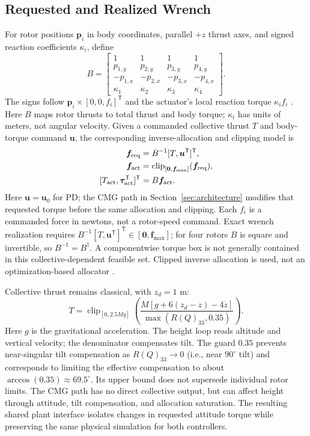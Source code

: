 \documentclass[letterpaper, 10 pt, conference]{ieeeconf}
\newcommand{\T}{^{\mathsf T}}
\newcommand{\clip}{\operatorname{clip}}
\begin{document}
\subsection{Requested and Realized Wrench}
For rotor positions $\bm p_i$ in body coordinates, parallel $+z$ thrust
axes, and signed reaction coefficients $\kappa_i$, define
\begin{equation}
 B=\begin{bmatrix}
 1&1&1&1\\p_{1,y}&p_{2,y}&p_{3,y}&p_{4,y}\\
 -p_{1,x}&-p_{2,x}&-p_{3,x}&-p_{4,x}\\
 \kappa_1&\kappa_2&\kappa_3&\kappa_4
 \end{bmatrix}.
 \label{eq:allocationmatrix}
\end{equation}
The signs follow $\bm p_i\times[0,0,f_i]\T$ and the actuator's local reaction torque $\kappa_i f_i$ \cite{garciacarrillo2013quad}. Here $B$ maps rotor thrusts to total thrust and body torque; $\kappa_i$ has units of meters, not angular velocity. Given a commanded collective thrust $T$ and body-torque command $\bm u$, the corresponding inverse-allocation and clipping model is
\begin{equation}
 \begin{aligned}
 \bm f_{\rm req}&=B^{-1}[T,\bm u\T]\T,\\
 \bm f_{\rm act}&=\clip_{[\bm0,\bm f_{\max}]}(\bm f_{\rm req}),\\
 [T_{\rm act},\bm\tau_{\rm act}\T]\T&=B\bm f_{\rm act}.
 \end{aligned}
 \label{eq:mixer}
\end{equation}
Here $\bm u=\bm u_0$ for PD; the CMG path in Section~\ref{sec:architecture}
modifies that requested torque before the same allocation and clipping.
Each $f_i$ is a commanded force in newtons, not a rotor-speed command.
Exact wrench realization requires $B^{-1}[T,\bm u\T]\T\in[\bm0,\bm f_{\max}]$; for four
rotors $B$ is square and invertible, so $B^{-1}=B^{\dagger}$.
A componentwise torque box is not generally contained in this
collective-dependent feasible set. Clipped inverse allocation is used,
not an optimization-based allocator \cite{monteiro2016allocation}.

Collective thrust remains classical, with $z_d=1$ m:
\begin{equation}
 T=\clip_{[0,2.5Mg]}
 \left(\frac{M[g+6(z_d-z)-4\dot z]}{\max(R(Q)_{33},0.35)}\right).
 \label{eq:collective}
\end{equation}
Here $g$ is the gravitational acceleration. The height loop reads altitude and vertical velocity; the denominator compensates tilt.
The guard $0.35$ prevents near-singular tilt compensation as $R(Q)_{33}\to0$
(i.e., near $90^\circ$ tilt) and corresponds to limiting the effective
compensation to about $\arccos(0.35)\approx69.5^\circ$. Its upper bound does
not supersede individual rotor limits. The CMG path has no direct collective
output, but can affect height through attitude, tilt compensation, and
allocation saturation.
The resulting shared plant interface isolates changes in requested
attitude torque while preserving the same physical simulation for both
controllers.
\end{document}
